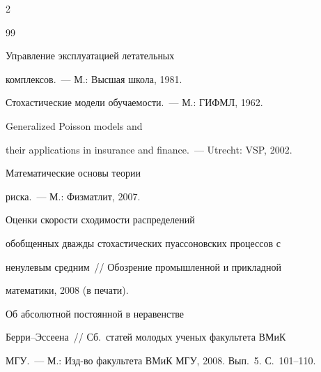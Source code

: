 \begin{multicols}{2}
{{\begin{thebibliography}{99}




Упpавление эксплуатацией летательных


комплексов.~--- М.: Высшая школа, 1981. %









Стохастические модели обучаемости.~--- М.: ГИФМЛ, 1962. %









Generalized Poisson models and


their applications in insurance and finance.~--- Utrecht: VSP, 2002. %









Математические основы теории


риска.~--- М.: Физматлит, 2007. %









Оценки скорости сходимости распределений


обобщенных дважды стохастических пуассоновских процессов с


ненулевым средним~// Обозрение промышленной и прикладной %


мате\-ма\-ти\-ки, 2008 (в печати). %





\label{end\stat}









Об абсолютной постоянной в неравенстве


Берри--Эссеена~// Сб.\ статей молодых ученых факультета ВМиК


МГУ.~--- М.: Изд-во факультета ВМиК МГУ, 2008. Вып.~5. С.~101--110. %


\end{thebibliography}


}


}


\end{multicols}


